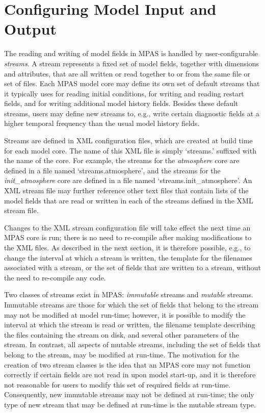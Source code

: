 \chapter{Configuring Model Input and Output}
\label{chap:mpas_io}

\newlength{\immindent}


\newlength{\mutindent}

The reading and writing of model fields in MPAS is handled by user-configurable {\em streams}. 
A stream represents a fixed set of model fields, together with dimensions and attributes, that are
all written or read together to or from the same file or set of files. Each MPAS model core may define
its own set of default streams that it typically uses for reading initial conditions, for writing and reading
restart fields, and for writing additional model history fields. Besides these default streams, users may define
new streams to, e.g., write certain diagnostic fields at a higher temporal frequency than the usual model
history fields.

Streams are defined in XML configuration files, which are created at build time for each model core. The name 
of this XML file is simply `streams.' suffixed with the name of the core. For example, the streams for 
the {\em atmosphere} core are defined in a file named `streams.atmosphere', and the streams for 
the {\em init\_atmosphere} core are defined in a file named `streams.init\_atmosphere'. An XML stream
file may further reference other text files that contain lists of the model fields that are read or written in
each of the streams defined in the XML stream file.

Changes to the XML stream configuration file will take effect the next time an MPAS core is run; there is no need
to re-compile after making modifications to the XML files. As described in the next section, it is therefore possible, e.g.,
to change the interval at which a stream is written, the template for the filenames associated with a stream, or the 
set of fields that are written to a stream, without the need to re-compile any code.

Two classes of streams exist in MPAS: {\em immutable} streams and {\em mutable} streams. Immutable streams
are those for which the set of fields that belong to the stream may not be modified at model run-time; however, it is
possible to modify the interval at which the stream is read or written, the filename template describing the files
containing the stream on disk, and several other parameters of the stream. In contrast, all aspects of mutable streams,
including the set of fields that belong to the stream, may be modified at run-time. The motivation for the creation of
two stream classes is the idea that an MPAS core may not function correctly if certain fields are not read in upon 
model start-up, and it is therefore not reasonable for users to modify this set of required fields at run-time. Consequently,
new immutable streams may not be defined at run-time; the only type of new stream that may be defined at run-time
is the mutable stream type.

